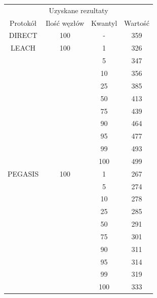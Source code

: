 \documentclass[a4paper,12pt,twoside,openany]{report}
\begin{document}
\begin{longtable}{*{4}{c}}
\toprule
\multicolumn{4}{c}{Uzyskane rezultaty} \\
Protokół	& Ilość węzłów	& Kwantyl	& Wartość \\
\midrule
\endhead
DIRECT	& 100 	& -	& 359 \\*
\midrule
LEACH	& 100	& 1	& 326 \\*
	&	& 5	& 347 \\*
	&	& 10	& 356 \\*
	&	& 25	& 385 \\*
	&	& 50	& 413 \\*
	&	& 75	& 439 \\*
	&	& 90	& 464 \\*
	&	& 95	& 477 \\*
	&	& 99	& 493 \\*
	&	& 100	& 499 \\*
\midrule
PEGASIS	& 100	& 1	& 267 \\*
	&	& 5	& 274 \\*
	&	& 10	& 278 \\*
	&	& 25	& 285 \\*
	&	& 50	& 291 \\*
	&	& 75	& 301 \\*
	&	& 90	& 311 \\*
	&	& 95	& 314 \\*
	&	& 99	& 319 \\*
	&	& 100	& 333 \\*
\bottomrule
\end{longtable}
\end{document}
